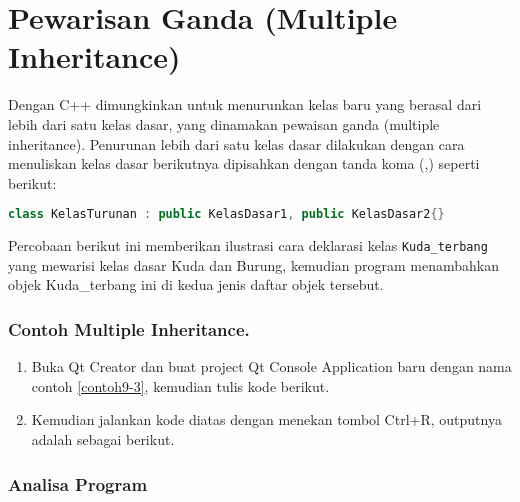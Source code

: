 \section{Pewarisan Ganda (Multiple
Inheritance)}\label{pewarisan-ganda-multiple-inheritance}

Dengan C++ dimungkinkan untuk menurunkan kelas baru yang berasal dari
lebih dari satu kelas dasar, yang dinamakan pewaisan ganda (multiple
inheritance). Penurunan lebih dari satu kelas dasar dilakukan dengan
cara menuliskan kelas dasar berikutnya dipisahkan dengan tanda koma (,)
seperti berikut:

\begin{lstlisting}[language=c++, numbers=none]
class KelasTurunan : public KelasDasar1, public KelasDasar2{}
\end{lstlisting}

Percobaan berikut ini memberikan ilustrasi cara deklarasi kelas
\texttt{Kuda\_terbang} yang mewarisi kelas dasar Kuda dan Burung,
kemudian program menambahkan objek Kuda\_terbang ini di kedua jenis
daftar objek tersebut.

\subsubsection*{Contoh Multiple Inheritance.}

\begin{enumerate}

\item
  Buka Qt Creator dan buat project Qt Console Application baru dengan
  nama contoh \ref{contoh9-3}, kemudian tulis kode berikut.




\item
  Kemudian jalankan kode diatas dengan menekan tombol Ctrl+R, outputnya
  adalah sebagai berikut.
\end{enumerate}

\begin{figure}[htbp]
\centering
{}

\end{figure}

\subsubsection*{Analisa Program}

